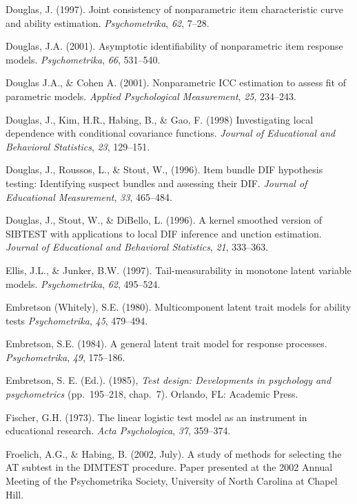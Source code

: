 \documentclass[titlepage,11pt,twoside]{article}
\begin{document}
\begin{thebibliography}
\bibitem Douglas, J. (1997). Joint consistency of nonparametric item characteristic curve and ability estimation. \textit{Psychometrika}, \textit{62}, 7--28.

\bibitem Douglas, J.A. (2001). Asymptotic identifiability of nonparametric item response models. \textit{Psychometrika}, \textit{66}, 531--540.

\bibitem Douglas J.A., \& Cohen A. (2001). Nonparametric ICC estimation to assess fit of parametric models. \textit{Applied Psychological Measurement}, \textit{25}, 234--243.

\bibitem Douglas, J., Kim, H.R., Habing, B., \& Gao, F. (1998) Investigating local dependence with conditional covariance functions. \textit{Journal of Educational and Behavioral Statistics}, \textit{23}, 129--151.

\bibitem Douglas, J., Roussos, L., \& Stout, W., (1996). Item bundle DIF hypothesis testing: Identifying suspect bundles and assessing their DIF. \textit{Journal of Educational Measurement}, \textit{33}, 465--484.

\bibitem Douglas, J., Stout, W., \& DiBello, L. (1996). A kernel smoothed version of SIBTEST with applications to local DIF inference and unction estimation. \textit{Journal of Educational and Behavioral Statistics}, \textit{21}, 333--363.

\bibitem Ellis, J.L., \& Junker, B.W. (1997). Tail-measurability in monotone latent variable models. \textit{Psychometrika}, \textit{62}, 495--524.

\bibitem Embretson (Whitely), S.E. (1980). Multicomponent latent trait models for ability tests \textit{Psychometrika}, \textit{45}, 479--494.

\bibitem Embretson, S.E. (1984). A general latent trait model for response processes. \textit{Psychometrika}, \textit{49}, 175--186.

\bibitem Embretson, S. E. (Ed.). (1985), \textit{Test design: Developments in psychology and psychometrics} (pp.~195--218, chap.~7). Orlando, FL: Academic Press.

\bibitem Fischer, G.H. (1973). The linear logistic test model as an instrument in educational research. \textit{Acta Psychologica}, \textit{37}, 359--374.

\bibitem Froelich, A.G., \& Habing, B. (2002, July). A study of methods for selecting the AT subtest in the DIMTEST procedure. Paper presented at the 2002 Annual Meeting of the Psychometrika Society, University of North Carolina at Chapel Hill.


\end{thebibliography}
\end{document}
